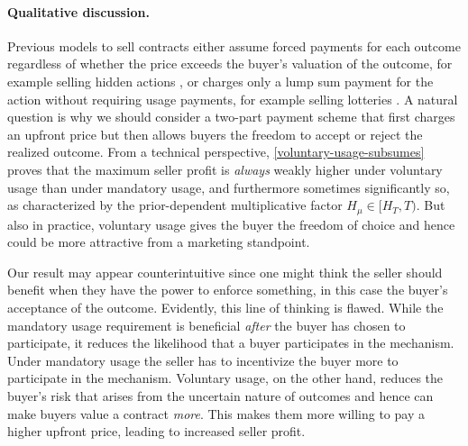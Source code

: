 \paragraph{Qualitative discussion.}

Previous models to sell contracts either assume forced payments for each outcome regardless of whether the price exceeds the buyer's valuation of the outcome, for example selling hidden actions \citep{bernasconi2024agent}, or charges only a lump sum payment for the action without requiring usage payments, for example selling lotteries \citep{chen2015complexity}. A natural  question is why we should consider a two-part payment scheme that first charges an  upfront price but then allows buyers the freedom to accept or reject the realized outcome.  From a technical perspective, \cref{voluntary-usage-subsumes} proves that the maximum seller profit is \emph{always} weakly higher under voluntary usage than under mandatory usage, and furthermore sometimes significantly so, as characterized by the prior-dependent multiplicative factor $H_\mu\in [H_T, T)$. But also in practice, voluntary usage gives the buyer the freedom of choice and hence could be more attractive from a marketing standpoint.


Our result may appear counterintuitive since one might think the seller should benefit when they have the power to enforce something, in this case the buyer's acceptance of the outcome. Evidently, this line of thinking is flawed. While the mandatory usage requirement is beneficial {\em after} the buyer has chosen to participate, it reduces the likelihood that a buyer participates in the mechanism. Under mandatory usage the seller has to incentivize the buyer more to participate in the mechanism. Voluntary usage, on the other hand, reduces the buyer's risk that arises from the uncertain nature of outcomes and hence can make buyers value a contract \emph{more}. This makes them more willing to pay a higher upfront price, leading to increased seller profit.





